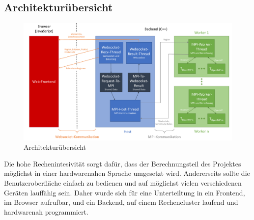 \subsection{Architekturübersicht}
\begin{figure}
	\centering
	\includegraphics[width=\linewidth]{img/Implementierung/ArchitekturAusfuehrlich.pdf}
	\caption{Architekturübersicht}
	\label{fig:architekturuebersicht_detail}
\end{figure}
Die hohe Rechenintesivität sorgt dafür, dass der Berechnungsteil des Projektes möglichst in einer
hardwarenahen Sprache umgesetzt wird.
Andererseits sollte die Benutzeroberfläche einfach zu bedienen und auf möglichst vielen verschiedenen Geräten lauffähig sein.
Daher wurde sich für eine Unterteiltung in ein Frontend, im Browser aufrufbar, und ein Backend, auf einem Rechencluster
laufend und hardwarenah programmiert.

